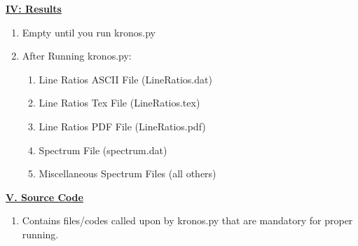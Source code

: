 \documentclass[twocolumn, prb, amsmath,amssymb,amsfonts]{revtex4}
\begin{document}
\underline{\textbf{IV: Results}}
\begin{enumerate}
\item Empty until you run kronos.py
\item After Running kronos.py:
\begin{enumerate}
\item Line Ratios ASCII File (LineRatios.dat)
\item Line Ratios Tex File (LineRatios.tex)
\item Line Ratios PDF File (LineRatios.pdf)
\item Spectrum File (spectrum.dat)
\item Miscellaneous Spectrum Files (all others)
\end{enumerate}
\end{enumerate}
\underline{\textbf{V. Source Code}}
\begin{enumerate}
\item Contains files/codes called upon by kronos.py that are mandatory for proper running.  
\end{enumerate}
\end{document}
